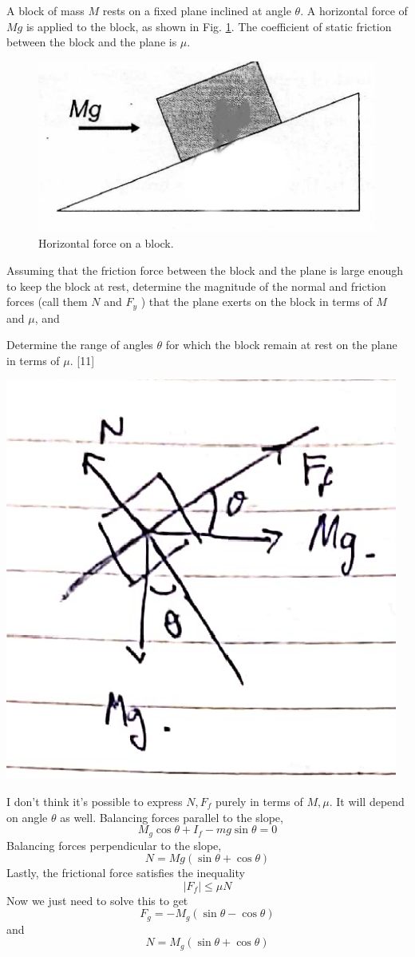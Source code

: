 \begin{problem}
    A block of mass $M$ rests on a fixed plane inclined at angle $\theta$. A horizontal force of $Mg$ is applied to the block, as shown in Fig. \ref{2010q2}. The coefficient of static friction between the block and the plane is $\mu$.
    \begin{figure}[h]
        \centering
        \includegraphics[width=0.5 \linewidth]{spho_book_TYS_images/2010q2.png}
        \caption{Horizontal force on a block.} \label{2010q2}
    \end{figure}
    \begin{subproblem}
        Assuming that the friction force between the block and the plane is large enough to keep the block at rest, determine the magnitude of the normal and friction forces (call them $N$ and $F_y$ ) that the plane exerts on the block in terms of $M$ and $\mu$, and
    \end{subproblem}

    \begin{subproblem}
        Determine the range of angles $\theta$ for which the block remain at rest on the plane in terms of $\mu$.  
    \hfill{[11]}\end{subproblem}
\end{problem}

\begin{solution}
\centering
\includegraphics[width=0.3\linewidth]{spho_book_TYS_images/2010q2_2.png}
    \begin{subsolution}
        I don't think it's possible to express $N, F_f$ purely in terms of $M,\mu$. It will depend on angle $\theta$ as well.
        Balancing forces parallel to the slope, \[M_{g} \cos \theta+{I}_{f}-m g \sin \theta=0\]
        Balancing forces perpendicular to the slope, \[N=M g(\sin \theta+\cos \theta)\]
        Lastly, the frictional force satisfies the inequality \[\left|F_{f}\right| \leq \mu N\]
        Now we just need to solve this to get \[F_{g}=-M_{g}(\sin \theta-\cos \theta)\] and \[N=M_{g}(\sin \theta+\cos \theta)\]
    \end{subsolution}
\end{solution}

